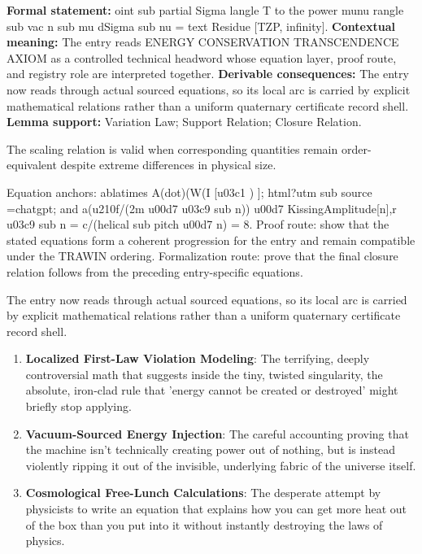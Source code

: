 \begingroup\footnotesize\setlength{\emergencystretch}{3em}\sloppy
\textbf{Formal statement:} oint sub partial Sigma langle T to the power munu rangle sub vac n sub mu dSigma sub nu = text Residue [TZP, infinity]. \textbf{Contextual meaning:} The entry reads ENERGY CONSERVATION TRANSCENDENCE AXIOM as a controlled technical headword whose equation layer, proof route, and registry role are interpreted together. \textbf{Derivable consequences:} The entry now reads through actual sourced equations, so its local arc is carried by explicit mathematical relations rather than a uniform quaternary certificate record shell. \textbf{Lemma support:} Variation Law; Support Relation; Closure Relation.\par
\endgroup

The scaling relation is valid when corresponding quantities remain order-equivalent despite extreme differences in physical size.

Equation anchors: ablatimes A(dot)(W(I [u03c1 ) ]; html?utm sub source =chatgpt; and a(u210f/(2m u00d7 u03c9 sub n)) u00d7 KissingAmplitude[n],r u03c9 sub n = c/(helical sub pitch u00d7 n) = 8. Proof route: show that the stated equations form a coherent progression for the entry and remain compatible under the TRAWIN ordering. Formalization route: prove that the final closure relation follows from the preceding entry-specific equations.

The entry now reads through actual sourced equations, so its local arc is carried by explicit mathematical relations rather than a uniform quaternary certificate record shell.
\endgroup

\begin{enumerate}[leftmargin=1.6em,itemsep=6pt,topsep=4pt]
\item \textbf{Localized First-Law Violation Modeling}: The terrifying, deeply controversial math that suggests inside the tiny, twisted singularity, the absolute, iron-clad rule that 'energy cannot be created or destroyed' might briefly stop applying.
\item \textbf{Vacuum-Sourced Energy Injection}: The careful accounting proving that the machine isn't technically creating power out of nothing, but is instead violently ripping it out of the invisible, underlying fabric of the universe itself.
\item \textbf{Cosmological Free-Lunch Calculations}: The desperate attempt by physicists to write an equation that explains how you can get more heat out of the box than you put into it without instantly destroying the laws of physics.
\end{enumerate}


